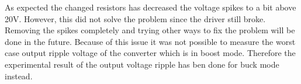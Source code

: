 As expected the changed resistors has decreased the voltage spikes to a bit above 20V. However, this did not solve the problem since the driver still broke. Removing the spikes completely and trying other ways to fix the problem will be done in the future.    
Because of this issue it was not possible to measure the worst case output ripple voltage of the converter which is in boost mode. Therefore the experimental result of the output voltage ripple has ben done for buck mode instead.   